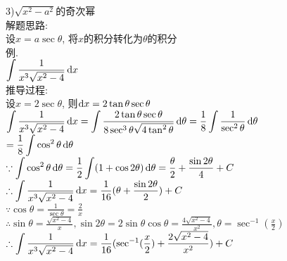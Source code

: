 3)$\sqrt{x^2-a^2}$的奇次幂\\
解题思路:\\
设$x=a\sec\theta$, 将$x$的积分转化为$\theta$的积分\\
例.\\
\phantom{例}$\displaystyle\int\frac{1}{x^3\sqrt{x^2-4}}\mathop{}\!\mathrm{d} x$\\
推导过程:\\
设$x=2\sec\theta$, 则$\mathop{}\!\mathrm{d} x=2\tan\theta\sec\theta$\\
$\displaystyle\int\frac{1}{x^3\sqrt{x^2-4}}\mathop{}\!\mathrm{d} x=\int\frac{2\tan\theta\sec\theta}{8\sec^3\theta\sqrt{4\tan^2\theta}}\mathop{}\!\mathrm{d}\theta=\frac{1}{8}\int\frac{1}{\sec^2\theta}\mathop{}\!\mathrm{d}\theta$\\
$\displaystyle=\frac{1}{8}\int\cos^2\theta\mathop{}\!\mathrm{d}\theta$\\
$\displaystyle\because\int\cos^2\theta\mathop{}\!\mathrm{d}\theta=\frac{1}{2}\int(1+\cos2\theta)\mathop{}\!\mathrm{d}\theta=\frac{\theta}{2}+\frac{\sin2\theta}{4}+C$\\
$\displaystyle\therefore\int\frac{1}{x^3\sqrt{x^2-4}}\mathop{}\!\mathrm{d} x=\frac{1}{16}(\theta+\frac{\sin2\theta}{2})+C$\\
$\displaystyle\because\cos\theta=\frac{1}{\sec\theta}=\frac{2}{x}$\\
$\displaystyle\therefore\sin\theta=\frac{\sqrt{x^2-4}}{x},\sin2\theta=2\sin\theta\cos\theta=\frac{4\sqrt{x^2-4}}{x^2},\theta=\sec^{-1}(\frac{x}{2})$\\
$\displaystyle\therefore\int\frac{1}{x^3\sqrt{x^2-4}}\mathop{}\!\mathrm{d} x=\frac{1}{16}(\sec^{-1}(\frac{x}{2})+\frac{2\sqrt{x^2-4}}{x^2})+C$\\

